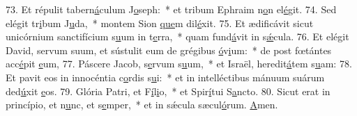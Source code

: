 73. Et répulit tabern\uline{á}culum J\uline{o}seph:~* et tribum Ephraim n\uline{o}n el\uline{é}git.
74. Sed elégit tr\uline{i}bum J\uline{u}da,~* montem Sion \uline{que}m dil\uline{é}xit.
75. Et ædificávit sicut unicórnium sanctifícium s\uline{u}um in t\uline{e}rra,~* quam fund\uline{á}vit in s\uline{ǽ}cula.
76. Et elégit David, servum suum, et sústulit eum de grégibus \uline{ó}v\uline{i}um:~* de post fœtántes acc\uline{é}pit \uline{e}um,
77. Páscere Jacob, s\uline{e}rvum s\uline{u}um,~* et Israël, heredit\uline{á}tem s\uline{u}am:
78. Et pavit eos in innocéntia c\uline{o}rdis s\uline{u}i:~* et in intelléctibus mánuum suárum ded\uline{ú}xit \uline{e}os.
79. Glória Patri, et F\uline{í}l\uline{i}o,~* et Spir\uline{í}tui S\uline{a}ncto.
80. Sicut erat in princípio, et n\uline{u}nc, et s\uline{e}mper,~* et in sǽcula sæcul\uline{ó}rum. \uline{A}men.
